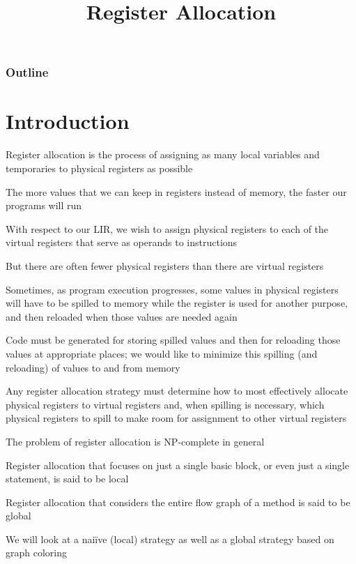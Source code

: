 \documentclass[8pt,a4paper,compress]{beamer}
\title{Register Allocation}
\date{}
\begin{document}
\begin{frame}
\vfill
\titlepage
\end{frame}

\begin{frame}
\frametitle{Outline}
\tableofcontents
\end{frame}

\section{Introduction}
\begin{frame}[fragile]
\pause

Register allocation is the process of assigning as many local variables and temporaries to physical registers as possible

\pause
\bigskip

The more values that we can keep in registers instead of memory, the faster our programs will run

\pause
\bigskip

With respect to our LIR, we wish to assign physical registers to each of the virtual registers that serve as operands to instructions

\pause
\bigskip

But there are often fewer physical registers than there are virtual registers

\pause
\bigskip

Sometimes, as program execution progresses, some values in physical registers will have to be spilled to memory while the register is used for another purpose, and then reloaded when those values are needed again

\pause
\bigskip

Code must be generated for storing spilled values and then for reloading those values at appropriate places; we would like to minimize this spilling (and reloading) of values to and from memory
\end{frame}

\begin{frame}[fragile]
\pause

Any register allocation strategy must determine how to most effectively allocate physical registers to virtual registers and, when spilling is necessary, which physical registers to spill to make room for assignment to other virtual registers

\pause
\bigskip

The problem of register allocation is NP-complete in general

\pause
\bigskip

Register allocation that focuses on just a single basic block, or even just a single statement,
is said to be local

\pause
\bigskip

Register allocation that considers the entire flow graph of a method is said to be global

\pause
\bigskip

We will look at a nai\"{i}ve (local) strategy as well as a global strategy based on graph coloring
\end{frame}
\end{document}
